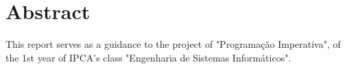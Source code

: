
\chapter*{Abstract}

This report serves as a guidance to the project of "Programação Imperativa", of the 1st year of IPCA's class "Engenharia de Sistemas Informáticos".